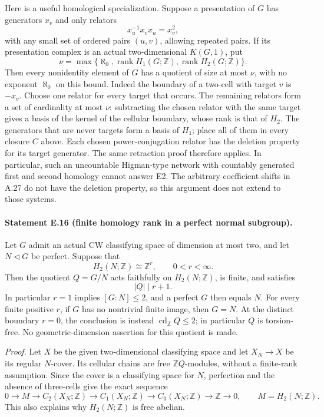 Here is a useful homological specialization. Suppose a presentation
of $G$ has generators $x_v$ and only relators
\[
 x_u^{-1}x_vx_u=x_v^2,
\]
with any small set of ordered pairs $(u,v)$, allowing repeated
pairs. If its presentation complex is an actual two-dimensional
$K(G,1)$, put
\[
 \nu=\max\{\aleph_0,\operatorname{rank}H_1(G;\mathbb Z),
                         \operatorname{rank}H_2(G;\mathbb Z)\}.
\]
Then every nonidentity element of $G$ has a quotient of size at
most $\nu$, with no exponent $\aleph_0$ on this bound.
Indeed the boundary of a two-cell with target $v$ is $-x_v$.
Choose one relator for every target that occurs. The remaining
relators form a set of cardinality at most $\nu$: subtracting
the chosen relator with the same target gives a basis of the
kernel of the cellular boundary, whose rank is that of $H_2$.
The generators that are never targets form a basis of $H_1$;
place all of them in every closure $C$ above. Each chosen
power-conjugation relator has the deletion property for its
target generator. The same retraction proof therefore applies.
In particular, such an uncountable Higman-type network with
countably generated first and second homology cannot answer E2.
The arbitrary coefficient shifts in A.27 do not have the
deletion property, so this argument does not extend to those
systems.

\paragraph{Statement E.16 (finite homology rank in a perfect normal subgroup).}
Let $G$ admit an actual CW classifying space of dimension at most two,
and let $N\triangleleft G$ be perfect. Suppose that
\[
 H_2(N;\mathbb Z)\cong\mathbb Z^r,
 \qquad 0<r<\infty.
\]
Then the quotient $Q=G/N$ acts faithfully on $H_2(N;\mathbb Z)$,
is finite, and satisfies
\[
                         |Q|\mid r+1.
\]
In particular $r=1$ implies $[G:N]\leq2$, and a perfect $G$ then
equals $N$. For every finite positive $r$, if $G$ has no nontrivial
finite image, then $G=N$. At the distinct boundary $r=0$, the
conclusion is instead $\operatorname{cd}_{\mathbb Z}Q\leq2$;
in particular $Q$ is torsion-free. No geometric-dimension assertion
for this quotient is made.

\emph{Proof.}
Let $X$ be the given two-dimensional classifying space and let
$X_N\to X$ be its regular $N$-cover. Its cellular chains are free
$\mathbb ZQ$-modules, without a finite-rank assumption. Since the
cover is a classifying space for $N$, perfection and the absence
of three-cells give the exact sequence
\[
 0\longrightarrow M\longrightarrow C_2(X_N;\mathbb Z)
 \longrightarrow C_1(X_N;\mathbb Z)
 \longrightarrow C_0(X_N;\mathbb Z)
 \longrightarrow\mathbb Z\longrightarrow0,
 \qquad M=H_2(N;\mathbb Z).
 \tag{E.16.1}
\]
This also explains why $H_2(N;\mathbb Z)$ is free abelian.

